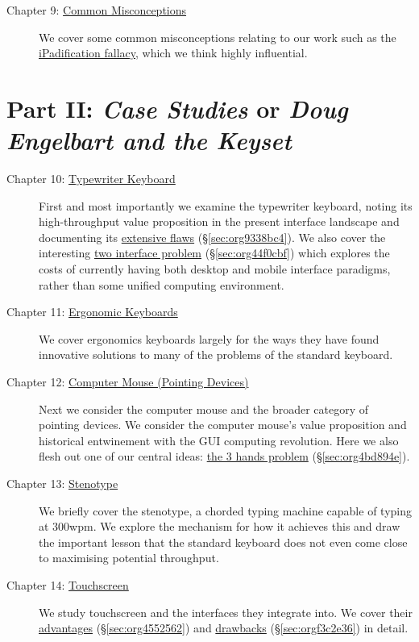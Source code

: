 \documentclass[logo,bsc,singlespacing,parskip]{infthesis}
\begin{document}
\begin{description}
\begin{description}
\item[{Chapter 9: \hyperref[sec:org650adbc]{Common Misconceptions}}] We cover some common misconceptions relating to our work such as the \hyperref[ipadification fallacy]{iPadification fallacy}, which we think highly influential.
\end{description}
\end{description}

\section*{Part II: \emph{Case Studies} or \emph{Doug Engelbart and the Keyset}}
\label{sec:org1bf2814}
\begin{description}
\item[{Chapter 10: \hyperref[sec:org20f3860]{Typewriter Keyboard}}] First and most importantly we examine the typewriter keyboard, noting its high-throughput value proposition in the present interface landscape and documenting its \hyperref[sec:org9338bc4]{extensive flaws} (\S \ref{sec:org9338bc4}).
We also cover the interesting \hyperref[sec:org44f0cbf]{two interface problem} (\S \ref{sec:org44f0cbf}) which explores the costs of currently having both desktop and mobile interface paradigms, rather than some unified computing environment.

\item[{Chapter 11: \hyperref[sec:org895c4cc]{Ergonomic Keyboards}}] We cover ergonomics keyboards largely for the ways they have found innovative solutions to many of the problems of the standard keyboard.

\item[{Chapter 12: \hyperref[sec:org9f2dc02]{Computer Mouse (Pointing Devices)}}] Next we consider the computer mouse and the broader category of pointing devices.
We consider the computer mouse's value proposition and historical entwinement with the GUI computing revolution.
Here we also flesh out one of our central ideas: \hyperref[sec:org4bd894e]{the 3 hands problem} (\S \ref{sec:org4bd894e}).

\item[{Chapter 13: \hyperref[sec:orgdb71557]{Stenotype} }] We briefly cover the stenotype, a chorded typing machine capable of typing at 300wpm.
We explore the mechanism for how it achieves this and draw the important lesson that the standard keyboard does not even come close to maximising potential throughput.

\item[{Chapter 14:  \hyperref[sec:org492bcd7]{Touchscreen}}] We study touchscreen and the interfaces they integrate into.
We cover their \hyperref[sec:org4552562]{advantages} (\S \ref{sec:org4552562}) and \hyperref[sec:orgf3c2e36]{drawbacks} (\S \ref{sec:orgf3c2e36}) in detail.


\end{description}
\end{document}
